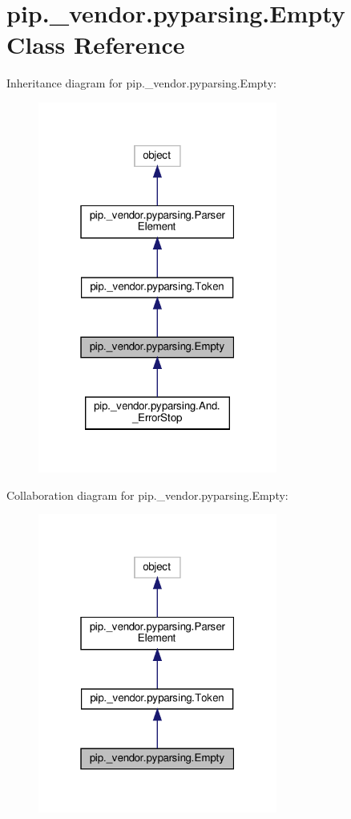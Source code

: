 \hypertarget{classpip_1_1__vendor_1_1pyparsing_1_1Empty}{}\section{pip.\+\_\+vendor.\+pyparsing.\+Empty Class Reference}
\label{classpip_1_1__vendor_1_1pyparsing_1_1Empty}


Inheritance diagram for pip.\+\_\+vendor.\+pyparsing.\+Empty\+:
\nopagebreak
\begin{figure}[H]
\begin{center}
\leavevmode
\includegraphics[width=223pt]{classpip_1_1__vendor_1_1pyparsing_1_1Empty__inherit__graph}
\end{center}
\end{figure}


Collaboration diagram for pip.\+\_\+vendor.\+pyparsing.\+Empty\+:
\nopagebreak
\begin{figure}[H]
\begin{center}
\leavevmode
\includegraphics[width=223pt]{classpip_1_1__vendor_1_1pyparsing_1_1Empty__coll__graph}
\end{center}
\end{figure}
